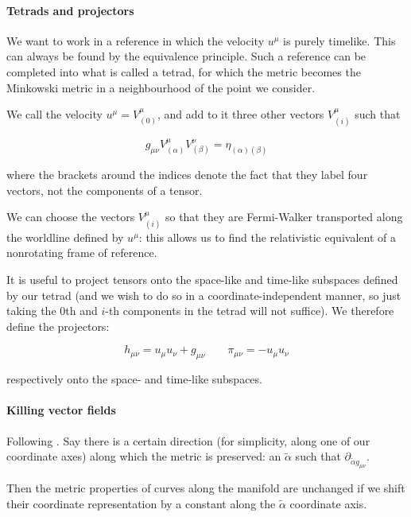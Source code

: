 \documentclass[main.tex]{subfiles}
\begin{document}
\paragraph{Tetrads and projectors}

We want to work in a reference in which the velocity $u^\mu$ is purely timelike. This can always be found by the equivalence principle. Such a reference can be completed into what  is called a tetrad, for which the metric becomes the Minkowski metric in a neighbourhood of the point we consider.

We call the velocity \(u^\mu = V^\mu _{(0)}\), and add to it three other vectors \(V^\mu_{(i)}\) such that

\begin{equation}
    g_{\mu\nu} V^\mu _{(\alpha)} V^\nu _{(\beta)} = \eta_{(\alpha) (\beta)}
\end{equation}

where the brackets around the indices denote the fact that they label four vectors, not the components of a tensor.

We can choose the vectors \(V_{(i)}^\mu\) so that they are Fermi-Walker transported along the worldline defined by \(u^\mu\): this allows us to find the relativistic equivalent of a nonrotating frame of reference.

It is useful to project tensors onto the space-like and time-like subspaces defined by our tetrad (and we wish to do so in a coordinate-independent manner,  so just taking the 0th and $i $-th components in the tetrad will not suffice). We therefore define the projectors:

\begin{equation}
    h_{\mu \nu} = u_\mu u_\nu + g_{\mu \nu} \qquad \pi_{\mu\nu} = -u_\mu u_\nu
\end{equation}

respectively onto the space- and time-like subspaces.

\paragraph{Killing vector fields}

Following \cite[section 25.2, page 650]{Misner:1973}.
Say there is a certain direction (for simplicity, along one of our coordinate axes) along which the metric is preserved: an \(\widetilde{\alpha}\) such that \(\partial_{\widetilde{\alpha} g_{\mu\nu}}\).

Then the metric properties of curves along the manifold are unchanged if we shift their coordinate representation by a constant along the \(\widetilde{\alpha}\) coordinate axis.
\end{document}
